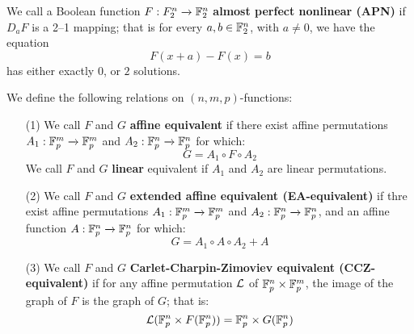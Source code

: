 \begin{definition}
  We call a Boolean function $F:F_2^n \xrightarrow{} \mathbb{F}_2^n$ \textbf{almost
  perfect nonlinear (APN)} if $D_a{F}$ is a 2--1 mapping; that is for every
  $a,b \in \mathbb{F}_2^n$, with $a \neq 0$, we have the equation
  \begin{equation*}
    F(x+a)-F(x)=b
  \end{equation*}
  has either exactly $0$, or  $2$ solutions.
\end{definition}

\begin{definition}
  We define the following relations on $(n,m,p)$-functions:
  \begin{enumerate}
    \item[(1)] We call $F$ and $G$ \textbf{affine equivalent} if there exist
      affine permutations $A_1:\mathbb{F}_p^m \xrightarrow{} \mathbb{F}_p^m$ and $A_2:\mathbb{F}_p^n
      \xrightarrow{} \mathbb{F}_p^n$ for which:
      \begin{equation*}
        G=A_1 \circ F \circ A_2
      \end{equation*}
      We call $F$ and $G$ \textbf{linear} equivalent if $A_1$ and $A_2$ are
      linear permutations.

    \item[(2)] We call $F$ and $G$ \textbf{extended affine equivalent
      (EA-equivalent)} if thre exist affine permutations $A_1:\mathbb{F}_p^m
      \xrightarrow{} \mathbb{F}_p^m$ and $A_2:\mathbb{F}_p^n \xrightarrow{} \mathbb{F}_p^n$, and an
      affine function $A:\mathbb{F}_p^n \xrightarrow{} \mathbb{F}_p^n$ for which:
      \begin{equation*}
        G=A_1 \circ A \circ A_2+A
      \end{equation*}

    \item[(3)] We call $F$ and $G$ \textbf{Carlet-Charpin-Zimoviev equivalent
      (CCZ-equivalent)} if for any affine permutation $\mathcal{L}$ of  $\mathbb{F}_p^n \times
      \mathbb{F}_p^m$, the image of the graph of $F$ is the graph of $G$; that is:
      \begin{equation*}
        \mathcal{L}(\mathbb{F}_p^n \times F(\mathbb{F}_p^n))=\mathbb{F}_p^n \times G(\mathbb{F}_p^n)
      \end{equation*}
  \end{enumerate}
\end{definition}

